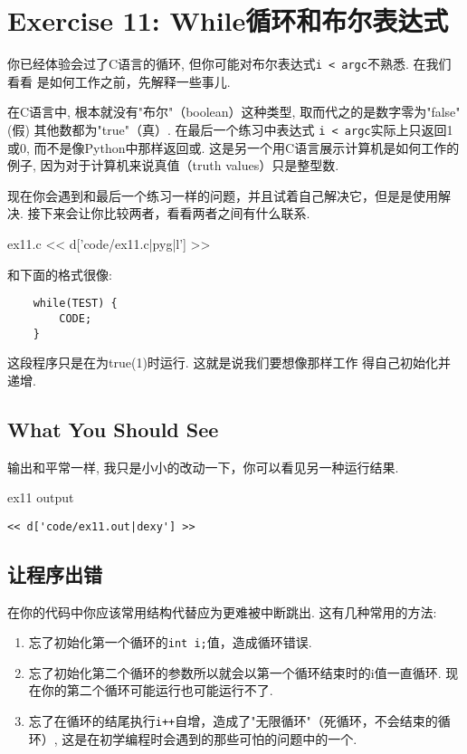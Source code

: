 \chapter{Exercise 11: While循环和布尔表达式}

你已经体验会过了C语言的循环, 但你可能对布尔表达式\verb|i < argc|不熟悉. 在我们看看  是如何工作之前，先解释一些事儿.

在C语言中, 根本就没有"布尔"（boolean）这种类型, 取而代之的是数字零为"false"(假) 其他数都为"true"（真）. 在最后一个练习中表达式 \verb|i < argc|实际上只返回1或0, 而不是像Python中那样返回或. 这是另一个用C语言展示计算机是如何工作的例子, 因为对于计算机来说真值（truth values）只是整型数.

现在你会遇到和最后一个练习一样的问题，并且试着自己解决它，但是是使用解决. 接下来会让你比较两者，看看两者之间有什么联系.

\begin{code}{ex11.c}
<< d['code/ex11.c|pyg|l'] >>
\end{code}

和下面的格式很像:

\begin{Verbatim}
    while(TEST) {
        CODE;
    }
\end{Verbatim}

这段程序只是在为true(1)时运行.
这就是说我们要想像那样工作
得自己初始化并递增.

\section{What You Should See}

输出和平常一样, 我只是小小的改动一下，你可以看见另一种运行结果.

\begin{code}{ex11 output}
\begin{lstlisting}
<< d['code/ex11.out|dexy'] >>
\end{lstlisting}
\end{code}

\section{让程序出错}

在你的代码中你应该常用结构代替应为更难被中断跳出. 这有几种常用的方法:

\begin{enumerate}
\item 忘了初始化第一个循环的\verb|int i;|值，造成循环错误.
\item 忘了初始化第二个循环的参数所以就会以第一个循环结束时的i值一直循环. 现在你的第二个循环可能运行也可能运行不了.
\item 忘了在循环的结尾执行\verb|i++|自增，造成了"无限循环"（死循环，不会结束的循环）, 这是在初学编程时会遇到的那些可怕的问题中的一个.
\end{enumerate}

